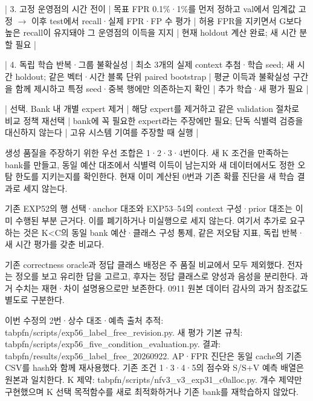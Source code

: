 | 3. 고정 운영점의 시간 전이 | 목표 FPR 0.1\%·1\%를 먼저 정하고 val에서 임계값 고정  \ensuremath{\rightarrow}  이후 test에서 recall·실제 FPR·FP 수 평가 | 허용 FPR을 지키면서 G보다 높은 recall이 유지돼야 그 운영점의 이득을 지지 | 현재 holdout 계산 완료; 새 시간 분할 필요 |

| 4. 독립 학습 반복·그룹 불확실성 | 최소 3개의 실제 context 추첨·학습 seed; 새 시간 holdout; 같은 벡터·시간 블록 단위 paired bootstrap | 평균 이득과 불확실성 구간을 함께 제시하고 특정 seed·중복 행에만 의존하는지 확인 | 추가 학습·새 평가 필요 |

| 선택. Bank 내 개별 expert 제거 | 해당 expert를 제거하고 같은 validation 절차로 비교 정책 재선택 | bank에 꼭 필요한 expert라는 주장에만 필요; 단독 식별력 검증을 대신하지 않는다 | 고유 시스템 기여를 주장할 때 실행 |

생성 품질을 주장하기 위한 우선 조합은 1·2·3·4번이다. 새 K 조건을 만족하는 bank를 만들고, 동일 예산 대조에서 식별력 이득이 남는지와 새 데이터에서도 정한 오탐 한도를 지키는지를 확인한다. 현재 이미 계산된 0번과 기존 확률 진단을 새 학습 결과로 세지 않는다.

기존 EXP52의 행 선택·anchor 대조와 EXP53–54의 context 구성·prior 대조는 이미 수행된 부분 근거다. 이를 폐기하거나 미실행으로 세지 않는다. 여기서 추가로 요구하는 것은 K<C의 동일 bank 예산·클래스 구성 통제, 같은 저오탐 지표, 독립 반복·새 시간 평가를 갖춘 비교다.

기존 correctness oracle과 정답 클래스 배정은 주 품질 비교에서 모두 제외했다. 전자는 정오를 보고 유리한 답을 고르고, 후자는 정답 클래스로 양성과 음성을 분리한다. 과거 수치는 재현·차이 설명용으로만 보존한다. 0911 원본 데이터 감사의 과거 참조값도 별도로 구분한다.

이번 수정의 2번·상수 대조·예측 출처 추적: tabpfn/\allowbreak{}scripts/\allowbreak{}exp56\_\allowbreak{}label\_\allowbreak{}free\_\allowbreak{}revision.py. 새 평가 기본 규칙: tabpfn/\allowbreak{}scripts/\allowbreak{}exp56\_\allowbreak{}five\_\allowbreak{}condition\_\allowbreak{}evaluation.py. 결과: tabpfn/\allowbreak{}results/\allowbreak{}exp56\_\allowbreak{}label\_\allowbreak{}free\_\allowbreak{}20260922. AP·FPR 진단은 동일 cache의 기존 CSV를 hash와 함께 재사용했다. 기존 조건 1·3·4·5의 점수와 S/\allowbreak{}S+\allowbreak{}V 예측 배열은 원본과 일치한다. K 제약: tabpfn/\allowbreak{}scripts/\allowbreak{}nfv3\_\allowbreak{}v3\_\allowbreak{}exp31\_\allowbreak{}c0alloc.py. 개수 제약만 구현했으며 K 선택 목적함수를 새로 최적화하거나 기존 bank를 재학습하지 않았다.



